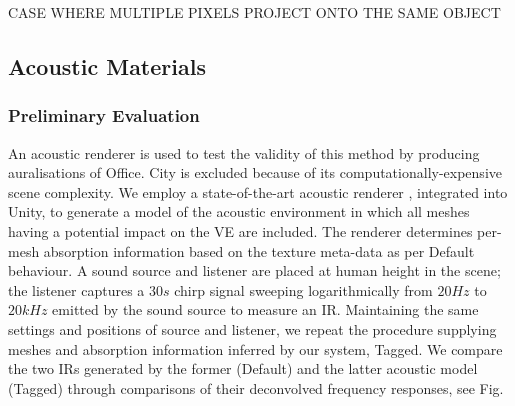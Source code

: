CASE WHERE MULTIPLE PIXELS PROJECT ONTO THE SAME OBJECT

\subsection{Acoustic Materials}



\subsubsection{Preliminary Evaluation}
An acoustic renderer is used to test the validity of this method by producing auralisations of Office. City is excluded because of its computationally-expensive scene complexity. We employ a state-of-the-art acoustic renderer \cite{raghuvanshi2014parametric}, integrated into Unity, to generate a model of the acoustic environment in which all meshes having a potential impact on the VE are included. The renderer determines per-mesh absorption information based on the texture meta-data as per Default behaviour. A sound source and listener are placed at human height in the scene; the listener captures a $30s$ chirp signal sweeping logarithmically from $20Hz$ to $20kHz$ emitted by the sound source to measure an IR. Maintaining the same settings and positions of source and listener, we repeat the procedure supplying meshes and absorption information inferred by our system, Tagged. We compare the two IRs generated by the former (Default) and the latter acoustic model (Tagged) through comparisons of their deconvolved frequency responses, see Fig.

